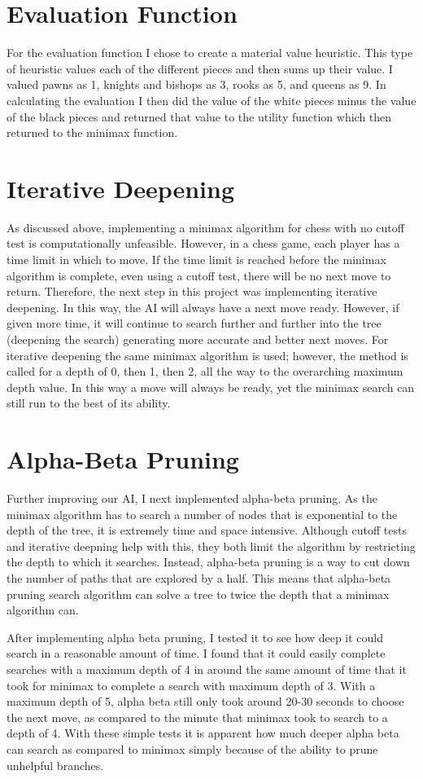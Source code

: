 \documentclass{article}
\begin{document}
\section{Evaluation Function}
For the evaluation function I chose to create a material value heuristic. This type of heuristic values each of the different pieces and then sums up their value. I valued pawns as 1, knights and bishops as 3, rooks as 5, and queens as 9. In calculating the evaluation I then did the value of the white pieces minus the value of the black pieces and returned that value to the utility function which then returned to the minimax function.

\section{Iterative Deepening}
As discussed above, implementing a minimax algorithm for chess with no cutoff test is computationally unfeasible. However, in a chess game, each player has a time limit in which to move. If the time limit is reached before the minimax algorithm is complete, even using a cutoff test, there will be no next move to return. Therefore, the next step in this project was implementing iterative deepening. In this way, the AI will always have a next move ready. However, if given more time, it will continue to search further and further into the tree (deepening the search) generating more accurate and better next moves. For iterative deepening the same minimax algorithm is used; however, the method is called for a depth of 0, then 1, then 2, all the way to the overarching maximum depth value. In this way a move will always be ready, yet the minimax search can still run to the best of its ability. 

\section{Alpha-Beta Pruning}
Further improving our AI, I next implemented alpha-beta pruning. As the minimax algorithm has to search a number of nodes that is exponential to the depth of the tree, it is extremely time and space intensive. Although cutoff tests and iterative deepning help with this, they both limit the algorithm by restricting the depth to which it searches. Instead, alpha-beta pruning is a way to cut down the number of paths that are explored by a half. This means that alpha-beta pruning search algorithm can solve a tree to twice the depth that a minimax algorithm can.

After implementing alpha beta pruning, I tested it to see how deep it could search in a reasonable amount of time. I found that it could easily complete searches with a maximum depth of 4 in around the same amount of time that it took for minimax to complete a search with maximum depth of 3. With a maximum depth of 5, alpha beta still only took around 20-30 seconds to choose the next move, as compared to the minute that minimax took to search to a depth of 4. With these simple tests it is apparent how much deeper alpha beta can search as compared to minimax simply because of the ability to prune unhelpful branches. 
\end{document}

